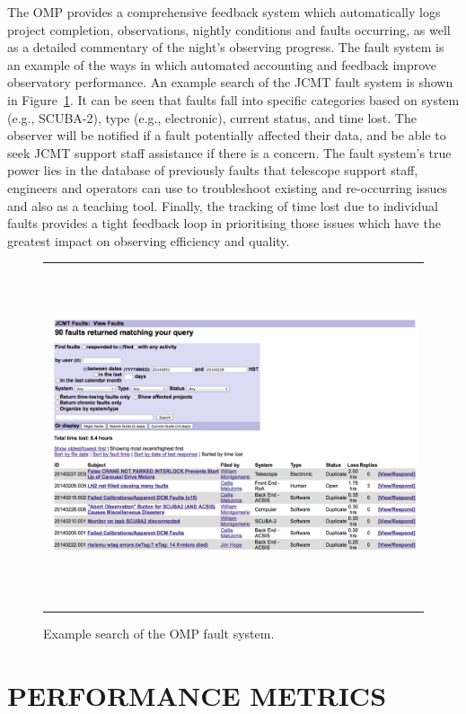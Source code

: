 \documentclass[]{spie}  %
\begin{document}
The OMP provides a comprehensive feedback system which automatically
logs project completion, observations, nightly conditions and faults
occurring, as well as a detailed commentary of the night's observing
progress. The fault system is an example of the ways in which
automated accounting and feedback improve observatory performance. An
example search of the JCMT fault system is shown in
Figure~\ref{fig:faulteg}. It can be seen that faults fall into
specific categories based on system (e.g., SCUBA-2), type (e.g.,
electronic), current status, and time lost. The observer will be
notified if a fault potentially affected their data, and be able to
seek JCMT support staff assistance if there is a concern. The fault
system's true power lies in the database of previously faults that
telescope support staff, engineers and operators can use to
troubleshoot existing and re-occurring issues and also as a teaching
tool. Finally, the tracking of time lost due to individual faults
provides a tight feedback loop in prioritising those issues which have
the greatest impact on observing efficiency and quality.

 \begin{figure}[t]
   \begin{center}
   \begin{tabular}{c}
   \includegraphics[height=10cm]{faultexample}
   \end{tabular}
   \end{center}
   \caption{\label{fig:faulteg}Example search of the OMP fault system.}
\end{figure}


\section{PERFORMANCE METRICS} \label{sec:metrics}
\end{document}
